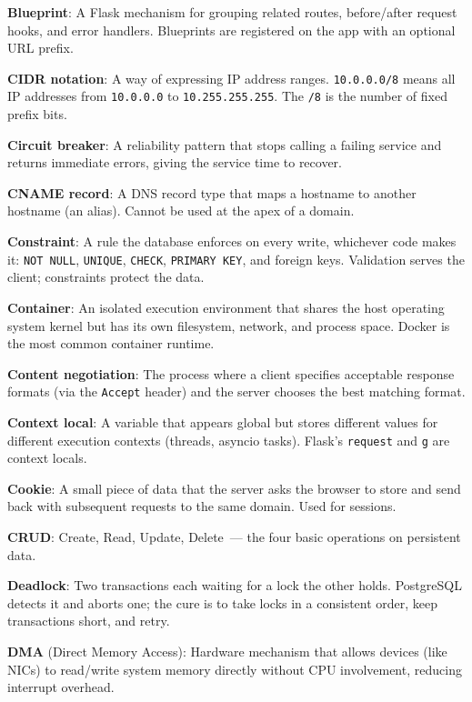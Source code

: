 \textbf{Blueprint}: A Flask mechanism for grouping related routes, before/after request hooks, and error handlers. Blueprints are registered on the app with an optional URL prefix.

\textbf{CIDR notation}: A way of expressing IP address ranges. \texttt{10.0.0.0/8} means all IP addresses from \texttt{10.0.0.0} to \texttt{10.255.255.255}. The \texttt{/8} is the number of fixed prefix bits.

\textbf{Circuit breaker}: A reliability pattern that stops calling a failing service and returns immediate errors, giving the service time to recover.

\textbf{CNAME record}: A DNS record type that maps a hostname to another hostname (an alias). Cannot be used at the apex of a domain.

\textbf{Constraint}: A rule the database enforces on every write, whichever code makes it: \texttt{NOT\ NULL}, \texttt{UNIQUE}, \texttt{CHECK}, \texttt{PRIMARY\ KEY}, and foreign keys. Validation serves the client; constraints protect the data.

\textbf{Container}: An isolated execution environment that shares the host operating system kernel but has its own filesystem, network, and process space. Docker is the most common container runtime.

\textbf{Content negotiation}: The process where a client specifies acceptable response formats (via the \texttt{Accept} header) and the server chooses the best matching format.

\textbf{Context local}: A variable that appears global but stores different values for different execution contexts (threads, asyncio tasks). Flask's \texttt{request} and \texttt{g} are context locals.

\textbf{Cookie}: A small piece of data that the server asks the browser to store and send back with subsequent requests to the same domain. Used for sessions.

\textbf{CRUD}: Create, Read, Update, Delete~--- the four basic operations on persistent data.

\textbf{Deadlock}: Two transactions each waiting for a lock the other holds. PostgreSQL detects it and aborts one; the cure is to take locks in a consistent order, keep transactions short, and retry.

\textbf{DMA} (Direct Memory Access): Hardware mechanism that allows devices (like NICs) to read/write system memory directly without CPU involvement, reducing interrupt overhead.


